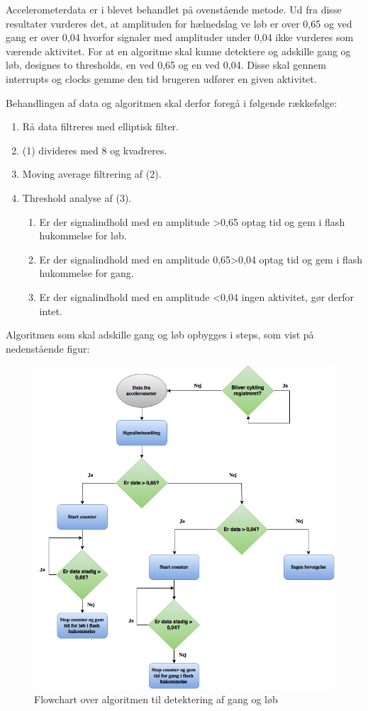 Accelerometerdata er i  blevet behandlet på ovenstående metode. Ud fra disse resultater vurderes det, at amplituden for hælnedslag ve løb er over 0,65 og ved gang er over 0,04 hvorfor signaler med amplituder under 0,04 ikke vurderes som værende aktivitet. For at en algoritme skal kunne detektere og adskille gang og løb, designes to thresholds, en ved 0,65 og en ved 0,04. Disse skal gennem interrupts og clocks gemme den tid brugeren udfører en given aktivitet.

Behandlingen af data og algoritmen skal derfor foregå i følgende rækkefølge:
\begin{enumerate}
	\item Rå data filtreres med elliptisk filter.
	\item (1) divideres med 8 og kvadreres.
	\item Moving average filtrering af (2). 
	\item Threshold analyse af (3). 
	\begin{enumerate}
		\item Er der signalindhold med en amplitude >0,65 \textrightarrow optag tid og gem i flash hukommelse for løb.
		\item Er der signalindhold med en amplitude 0,65>0,04 \textrightarrow optag tid og gem i flash hukommelse for gang.
		\item Er der signalindhold med en amplitude <0,04 \textrightarrow ingen aktivitet, gør derfor intet.
	\end{enumerate}
\end{enumerate}

Algoritmen som skal adskille gang og løb opbygges i steps, som vist på nedenstående figur:
\begin{figure}[H]
	\centering
	\includegraphics[scale=0.5]{figures/cDesign/algoritme_gl.png}
	\caption{Flowchart over algoritmen til detektering af gang og løb}
	\label{fig:algoritme}
\end{figure}




